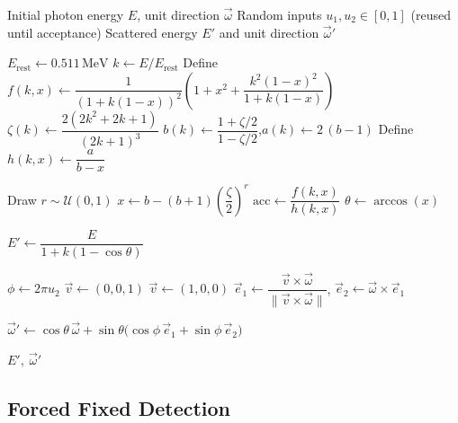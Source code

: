 \begin{algorithm}[H]
\caption{Compton Scattering (Klein--Nishina + Acceptance--Rejection)}
\label{alg:comptonScattering}
\begin{algorithmic}[1]
\Require Initial photon energy $E$, unit direction $\vec{\omega}$
\Require Random inputs $u_1,u_2 \in [0,1]$ (reused until acceptance)
\Ensure Scattered energy $E'$ and unit direction $\vec{\omega}'$

\State $E_{\mathrm{rest}} \gets 0.511\,\mathrm{MeV}$ 
\State $k \gets E/E_{\mathrm{rest}}$
\State Define $f(k,x) \gets \dfrac{1}{(1+k(1-x))^2}\!\left(1+x^2+\dfrac{k^2(1-x)^2}{1+k(1-x)}\right)$ 
\State $\zeta(k) \gets \dfrac{2(2k^2+2k+1)}{(2k+1)^3}$
\State $b(k) \gets \dfrac{1+\zeta/2}{1-\zeta/2}$,\quad $a(k) \gets 2\,(b-1)$
\State Define $h(k,x) \gets \dfrac{a}{b-x}$ 

\Repeat {}
    \State Draw $r \sim \mathcal{U}(0,1)$
    \State $x \gets b - (b+1)\left(\dfrac{\zeta}{2}\right)^{r}$ 
    \State $\mathrm{acc} \gets \dfrac{f(k,x)}{h(k,x)}$
\State $\theta \gets \arccos(x)$

\State $E' \gets \dfrac{E}{1+k(1-\cos\theta)}$ 

\State $\phi \gets 2\pi u_2$ 
 \State $\vec{v}\gets(0,0,1)$ \Else \State $\vec{v}\gets(1,0,0)$ \EndIf
\State $\vec{e}_1 \gets \dfrac{\vec{v}\times\vec{\omega}}{\|\vec{v}\times\vec{\omega}\|}$,\quad
       $\vec{e}_2 \gets \vec{\omega}\times\vec{e}_1$ 

\State $\vec{\omega}' \gets \cos\theta\,\vec{\omega} + \sin\theta\bigl(\cos\phi\,\vec{e}_1+\sin\phi\,\vec{e}_2\bigr)$

\State \Return $E',\ \vec{\omega}'$
\end{algorithmic}
\end{algorithm}


\subsection{Forced Fixed Detection}
\label{sc:forcedDetection}


